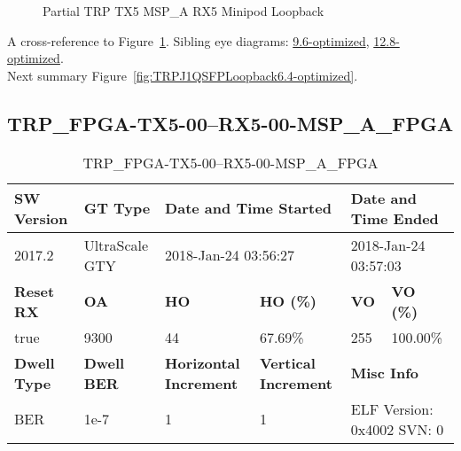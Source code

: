 \begin{figure}[h]
\begin{subfigure}{0.5\textwidth}
\hyperref[sec:TRPFPGATX506RX506MSPAFPGA6.4-optimized]{}
\end{subfigure}\hspace*{\fill}
\begin{subfigure}{0.5\textwidth}
\hyperref[sec:TRPFPGATX507RX507MSPAFPGA6.4-optimized]{}
\end{subfigure}

\caption{Partial TRP TX5 MSP\_A RX5 Minipod Loopback} \label{fig:PartialTRPTX5MSPARX5MinipodLoopback6.4-optimized}
\end{figure}

A cross-reference to Figure~\ref{fig:PartialTRPTX5MSPARX5MinipodLoopback6.4-optimized}.
Sibling eye diagrams: \hyperref[sec:PartialTRPTX5MSPARX5MinipodLoopback9.6-optimized]{9.6-optimized}, \hyperref[sec:PartialTRPTX5MSPARX5MinipodLoopback12.8-optimized]{12.8-optimized}. \\
Next summary Figure~\ref{fig:TRPJ1QSFPLoopback6.4-optimized}.
\clearpage
% 
\subsection{TRP\_FPGA-TX5-00--RX5-00-MSP\_A\_FPGA}\label{sec:TRPFPGATX500RX500MSPAFPGA6.4-optimized}

\begin{table}[h]
\centering
\caption{TRP\_FPGA-TX5-00--RX5-00-MSP\_A\_FPGA}
\label{tab:TRPFPGATX500RX500MSPAFPGA6.4-optimized}
\begin{tabular}{@{}|l|l|l|l|l|l|@{}}
\toprule
\textbf{SW Version}                & \textbf{GT Type}   & \multicolumn{2}{l|}{\textbf{Date and Time Started}}            & \multicolumn{2}{l|}{\textbf{Date and Time Ended}}        \\ \midrule
2017.2                       & UltraScale GTY          & \multicolumn{2}{l|}{2018-Jan-24 03:56:27}                   & \multicolumn{2}{l|}{2018-Jan-24 03:57:03}               \\ \midrule
\textbf{Reset RX}                  & \textbf{OA} & \textbf{HO}   & \textbf{HO (\%)} & \textbf{VO} & \textbf{VO (\%)} \\ \midrule
true & 9300        & 44          & 67.69\%        & 255        & 100.00\%       \\ \midrule
\textbf{Dwell Type}                & \textbf{Dwell BER} & \textbf{Horizontal Increment} & \textbf{Vertical Increment}    & \multicolumn{2}{l|}{\textbf{Misc Info}}                  \\ \midrule
BER                            & 1e-7        & 1        & 1           & \multicolumn{2}{l|}{ELF Version: 0x4002 SVN: 0}                         \\ \bottomrule
\end{tabular}
\end{table}

